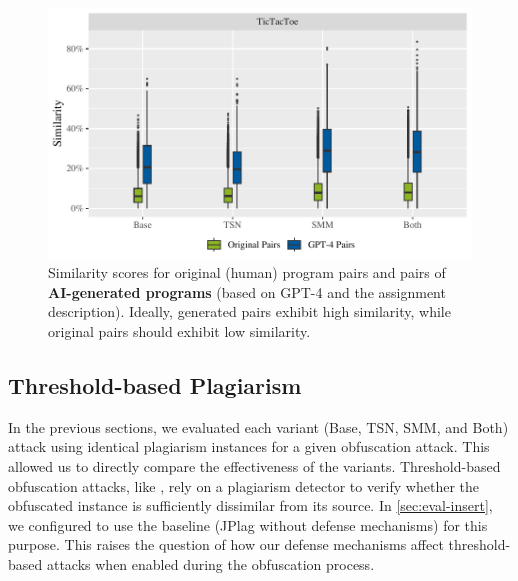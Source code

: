 

\begin{figure}
\centering
\includegraphics[width=\linewidth]{figures/disseval/eval-chatgpt-full_avg.similarity.pdf}
\caption[Evaluation Results: AI-based Generation]{Similarity scores for original (human) program pairs and pairs of \textbf{AI-generated programs} (based on GPT-4 and the assignment description). Ideally, generated pairs exhibit high similarity, while original pairs should exhibit low similarity.}
\label{fig:stage4-results}
\end{figure}

\subsection{Threshold-based Plagiarism}\label{sec:eval-mossad}

In the previous sections, we evaluated each variant (Base, TSN, SMM, and Both) attack using identical plagiarism instances for a given obfuscation attack.
This allowed us to directly compare the effectiveness of the variants.
Threshold-based obfuscation attacks, like \mossad, rely on a plagiarism detector to verify whether the obfuscated instance is sufficiently dissimilar from its source.
In \autoref{sec:eval-insert}, we configured \mossad to use the baseline (JPlag without defense mechanisms) for this purpose.
This raises the question of how our defense mechanisms affect threshold-based attacks when enabled during the obfuscation process.

